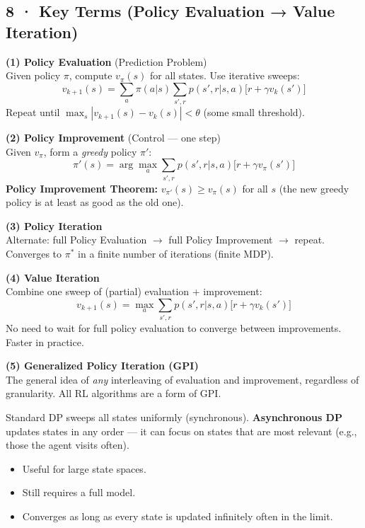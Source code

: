 \documentclass[11pt,a4paper]{article}
\begin{document}
\subsection*{8 · Key Terms (Policy Evaluation → Value Iteration)}

\begin{tcolorbox}[exam={Five Key Terms — Know Each Precisely}]
\textbf{(1) Policy Evaluation} (Prediction Problem)\\
\quad Given policy $\pi$, compute $v_\pi(s)$ for all states. Use iterative sweeps:
\[
  v_{k+1}(s) = \sum_a \pi(a|s) \sum_{s',r} p(s',r|s,a)\bigl[r + \gamma v_k(s')\bigr]
\]
Repeat until $\max_s |v_{k+1}(s) - v_k(s)| < \theta$ (some small threshold).

\medskip
\textbf{(2) Policy Improvement} (Control — one step)\\
\quad Given $v_\pi$, form a \emph{greedy} policy $\pi'$:
\[
  \pi'(s) = \arg\max_a \sum_{s',r} p(s',r|s,a)\bigl[r + \gamma v_\pi(s')\bigr]
\]
\textbf{Policy Improvement Theorem:} $v_{\pi'}(s) \geq v_\pi(s)$ for all $s$
(the new greedy policy is at least as good as the old one).

\medskip
\textbf{(3) Policy Iteration}\\
\quad Alternate: full Policy Evaluation $\to$ full Policy Improvement $\to$ repeat.\\
Converges to $\pi^*$ in a finite number of iterations (finite MDP).

\medskip
\textbf{(4) Value Iteration}\\
\quad Combine one sweep of (partial) evaluation + improvement:
\[
  v_{k+1}(s) = \max_a \sum_{s',r} p(s',r|s,a)\bigl[r + \gamma v_k(s')\bigr]
\]
No need to wait for full policy evaluation to converge between improvements.
Faster in practice.

\medskip
\textbf{(5) Generalized Policy Iteration (GPI)}\\
\quad The general idea of \emph{any} interleaving of evaluation and improvement, regardless of granularity.
All RL algorithms are a form of GPI.
\end{tcolorbox}

\begin{tcolorbox}[note={Asynchronous DP}]
Standard DP sweeps all states uniformly (synchronous). \textbf{Asynchronous DP} updates states
in any order — it can focus on states that are most relevant (e.g., those the agent visits often).
\begin{itemize}
  \item Useful for large state spaces.
  \item Still requires a full model.
  \item Converges as long as every state is updated infinitely often in the limit.
\end{itemize}
\end{tcolorbox}
\end{document}
